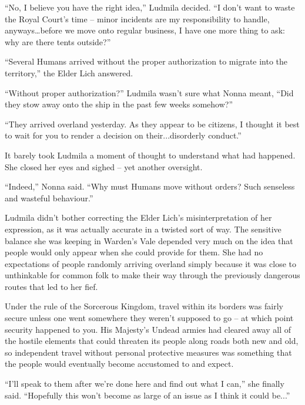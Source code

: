  

“No, I believe you have the right idea,” Ludmila decided. “I don’t want to waste the Royal Court’s time – minor incidents are my responsibility to handle, anyways…before we move onto regular business, I have one more thing to ask: why are there tents outside?”

 

“Several Humans arrived without the proper authorization to migrate into the territory,” the Elder Lich answered.

 

“Without proper authorization?” Ludmila wasn’t sure what Nonna meant, “Did they stow away onto the ship in the past few weeks somehow?”

 

“They arrived overland yesterday. As they appear to be citizens, I thought it best to wait for you to render a decision on their...disorderly conduct.”

 

It barely took Ludmila a moment of thought to understand what had happened. She closed her eyes and sighed – yet another oversight.

 

“Indeed,” Nonna said. “Why must Humans move without orders? Such senseless and wasteful behaviour.”

 

Ludmila didn’t bother correcting the Elder Lich’s misinterpretation of her expression, as it was actually accurate in a twisted sort of way. The sensitive balance she was keeping in Warden’s Vale depended very much on the idea that people would only appear when she could provide for them. She had no expectations of people randomly arriving overland simply because it was close to unthinkable for common folk to make their way through the previously dangerous routes that led to her fief.

 

Under the rule of the Sorcerous Kingdom, travel within its borders was fairly secure unless one went somewhere they weren’t supposed to go – at which point security happened to you. His Majesty’s Undead armies had cleared away all of the hostile elements that could threaten its people along roads both new and old, so independent travel without personal protective measures was something that the people would eventually become accustomed to and expect.

 

“I’ll speak to them after we’re done here and find out what I can,” she finally said. “Hopefully this won’t become as large of an issue as I think it could be...”

